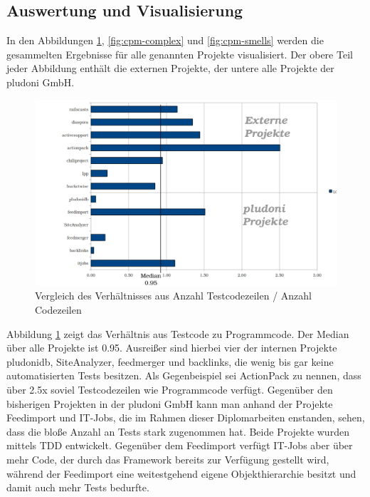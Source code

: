\subsection{Auswertung und Visualisierung}
In den Abbildungen \ref{fig:cpm-loclot}, \ref{fig:cpm-complex} und \ref{fig:cpm-smells} werden die gesammelten Ergebnisse für alle genannten Projekte visualisiert. Der obere Teil jeder Abbildung enthält die externen Projekte, der untere alle Projekte der pludoni GmbH.
\begin{figure}[htbp]
 \centering
 \includegraphics[width=\linewidth]{./diagrams/cpm-lotloc.pdf}
 \caption{Vergleich des Verhältnisses aus Anzahl Testcodezeilen / Anzahl Codezeilen}
 \label{fig:cpm-loclot}
\end{figure}

Abbildung \ref{fig:cpm-loclot} zeigt das Verhältnis aus Testcode zu Programmcode. Der Median über alle Projekte ist 0.95. Ausreißer sind hierbei vier der internen Projekte pludonidb, SiteAnalyzer, feedmerger und backlinks, die wenig bis gar keine automatisierten  Tests besitzen. Als Gegenbeispiel sei ActionPack zu nennen, dass über 2.5x soviel Testcodezeilen wie Programmcode verfügt. Gegenüber den bisherigen Projekten in der pludoni GmbH kann man anhand der Projekte Feedimport und IT-Jobs, die im Rahmen dieser Diplomarbeiten enstanden, sehen, dass die bloße Anzahl an Tests stark zugenommen hat. Beide Projekte wurden mittels TDD entwickelt. Gegenüber dem Feedimport verfügt IT-Jobs aber über mehr Code, der durch das Framework bereits zur Verfügung gestellt wird, während der Feedimport eine weitestgehend eigene Objekthierarchie besitzt und damit auch mehr Tests bedurfte.


